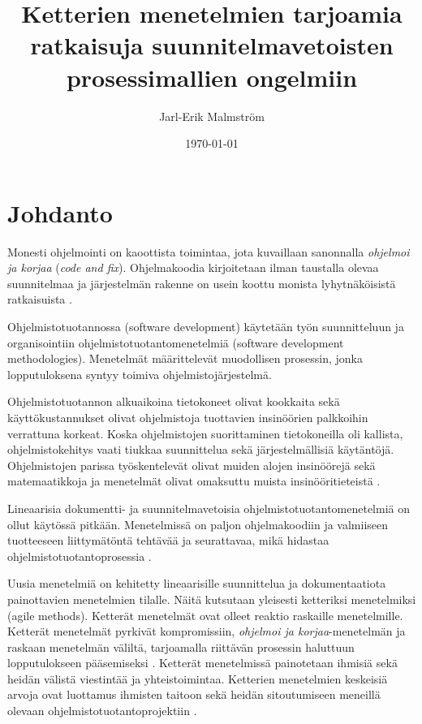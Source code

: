 \documentclass[finnish]{tktltiki2}
\title{Ketterien menetelmien tarjoamia ratkaisuja suunnitelmavetoisten prosessimallien ongelmiin}
\author{Jarl-Erik Malmström}
\date{\today}
\theoremstyle{definition}
\theoremstyle{remark}
\begin{document}

\maketitle        %
\makeabstract     %

\tableofcontents  %
\newpage          %



\section{Johdanto}

Monesti ohjelmointi on kaoottista toimintaa, jota kuvaillaan sanonnalla \textit{ohjelmoi ja korjaa} (\textit{code and fix}). Ohjelmakoodia kirjoitetaan ilman taustalla olevaa suunnitelmaa ja järjestelmän rakenne on usein koottu monista lyhytnäköisistä ratkaisuista \cite{FOW01a}.
 
Ohjelmistotuotannossa (software development) käytetään työn suunnitteluun ja organisointiin ohjelmistotuotantomenetelmiä (software development methodologies). Menetelmät määrittelevät muodollisen prosessin, jonka lopputuloksena syntyy toimiva ohjelmistojärjestelmä. 

Ohjelmistotuotannon alkuaikoina tietokoneet olivat kookkaita sekä käyttö\-kustannukset olivat ohjelmistoja tuottavien insinöörien palkkoihin verrattuna korkeat. Koska ohjelmistojen suorittaminen tietokoneilla oli kallista, ohjelmistokehitys vaati tiukkaa suunnittelua sekä järjestelmällisiä käytäntöjä. Ohjelmistojen parissa työskentelevät olivat muiden alojen insinöörejä sekä matemaatikkoja ja menetelmät olivat omaksuttu muista insinööritieteistä \cite{BOE06}.
 
Lineaarisia dokumentti- ja suunnitelmavetoisia ohjelmistotuotantomenetelmiä on ollut käytössä pitkään. Menetelmissä on paljon ohjelmakoodiin ja valmiiseen tuotteeseen liittymätöntä tehtävää ja seurattavaa, mikä hidastaa ohjelmistotuotantoprosessia \cite{FOW01a}.

Uusia menetelmiä on kehitetty lineaarisille suunnittelua ja dokumentaatiota painottavien menetelmien tilalle. Näitä kutsutaan yleisesti ketteriksi menetelmiksi (agile methods). Ketterät menetelmät ovat olleet reaktio raskaille menetelmille. Ketterät menetelmät pyrkivät kompromissiin, \textit{ohjelmoi ja korjaa}-menetelmän ja raskaan menetelmän väliltä, tarjoamalla riittävän prosessin haluttuun lopputulokseen pääsemiseksi \cite{FOW01a}. Ketterät menetelmissä painotetaan ihmisiä sekä heidän välistä viestintää ja yhteistoimintaa. Ketterien menetelmien keskeisiä arvoja ovat luottamus ihmisten taitoon sekä heidän sitoutumiseen meneillä olevaan ohjelmistotuotantoprojektiin \cite{COH01}.
\end{document}
